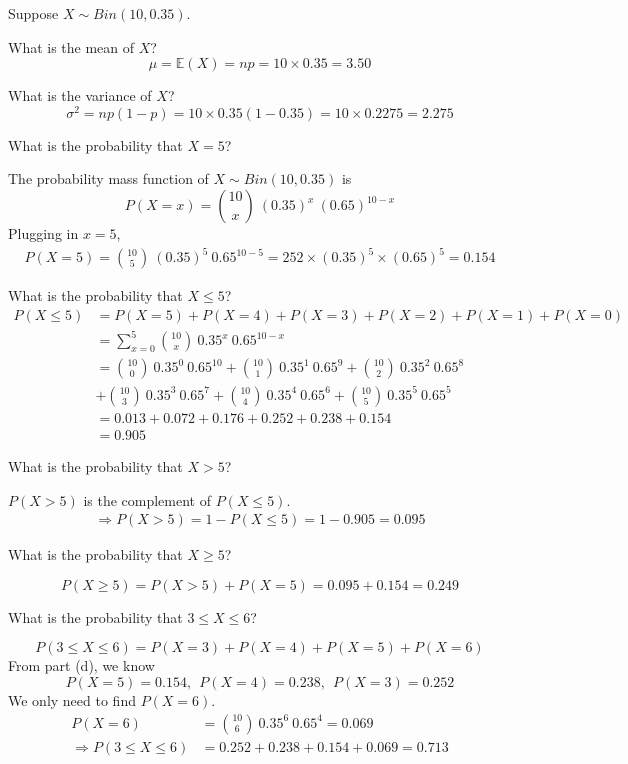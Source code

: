 \begin{example}
Suppose $X \sim Bin(10,0.35)$. 
\begin{benumerate}
\item What is the mean of $X$?
\[ \mu = \mathbb{E}(X) = np = 10 \times 0.35 = 3.50 \]

\item What is the variance of $X$?
\[ \sigma^{2} = np(1-p) = 10 \times 0.35 (1-0.35) = 10 \times 0.2275 = 2.275 \]

\item What is the probability that $X=5$? 

The probability mass function of $X \sim Bin(10, 0.35)$ is
\[ P(X=x) = {10 \choose x}~(0.35)^{x}~(0.65)^{10-x} \]
Plugging in $x=5$,
\begin{align*}
P(X=5)	= {10 \choose 5}~(0.35)^{5}~0.65^{10-5} = 252 \times (0.35)^{5} \times (0.65)^{5} = 0.154
\end{align*}
 
\item What is the probability that $X \leq 5$?
\begin{align*}
P(X \leq 5) &= P(X=5) + P(X=4) + P(X=3) + P(X=2) + P(X=1) + P(X=0) \\
			&= \sum_{x=0}^{5} {10 \choose x}~0.35^{x} ~0.65^{10-x} \\
			&= {10 \choose 0}~0.35^{0}~0.65^{10} + {10 \choose 1}~0.35^{1}~0.65^{9} + {10 \choose 2}~0.35^{2}~0.65^{8} \\ &+ {10 \choose 3}~0.35^{3}~0.65^{7}+{10 \choose 4}~ 0.35^{4}~0.65^{6} + {10 \choose 5}~0.35^{5}~0.65^{5} \\
			&= 0.013 + 0.072 + 0.176 + 0.252 + 0.238 + 0.154 \\
			&= 0.905
\end{align*}

\item What is the probability that $X > 5$? 

$P(X>5)$ is the complement of $P(X \leq 5)$.
\begin{align*}
\Rightarrow P(X>5) = 1 - P(X \leq 5) = 1 - 0.905 = 0.095
\end{align*}

\item What is the probability that $X \geq 5$?

\[ P(X \geq 5) = P(X >5) + P(X=5) = 0.095 + 0.154 = 0.249 \]

\item What is the probability that $3 \leq X \leq 6$?

\[
P(3 \leq X \leq 6) 	= P(X=3) + P(X=4) + P(X=5) + P(X=6)
\]
From part (d), we know
\[P(X=5)=0.154,~~P(X=4)=0.238,~~P(X=3) = 0.252\]
We only need to find $P(X=6)$.
\begin{align*}
P(X = 6) &= {10 \choose 6}~0.35^6~0.65^4=0.069\\
\Rightarrow P(3 \leq X \leq 6) &= 0.252+0.238+0.154+0.069=0.713
\end{align*}
\end{benumerate}
\end{example}


